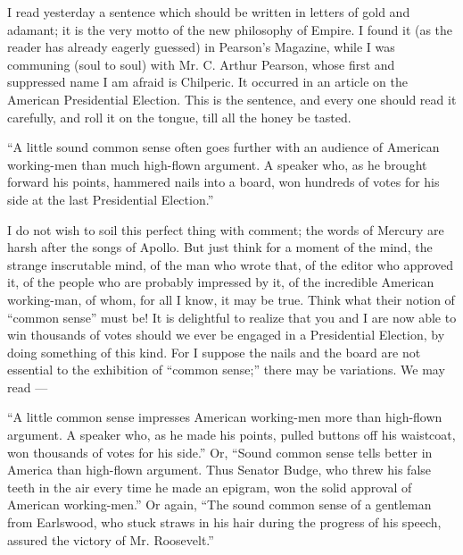 I read yesterday a sentence which should be written in letters of gold and adamant; it is the very motto of the new philosophy of Empire. I found it (as the reader has already eagerly guessed) in Pearson’s Magazine, while I was communing (soul to soul) with Mr. C. Arthur Pearson, whose first and suppressed name I am afraid is Chilperic. It occurred in an article on the American Presidential Election. This is the sentence, and every one should read it carefully, and roll it on the tongue, till all the honey be tasted.

“A little sound common sense often goes further with an audience of American working-men than much high-flown argument. A speaker who, as he brought forward his points, hammered nails into a board, won hundreds of votes for his side at the last Presidential Election.”

I do not wish to soil this perfect thing with comment; the words of Mercury are harsh after the songs of Apollo. But just think for a moment of the mind, the strange inscrutable mind, of the man who wrote that, of the editor who approved it, of the people who are probably impressed by it, of the incredible American working-man, of whom, for all I know, it may be true. Think what their notion of “common sense” must be! It is delightful to realize that you and I are now able to win thousands of votes should we ever be engaged in a Presidential Election, by doing something of this kind. For I suppose the nails and the board are not essential to the exhibition of “common sense;” there may be variations. We may read —

“A little common sense impresses American working-men more than high-flown argument. A speaker who, as he made his points, pulled buttons off his waistcoat, won thousands of votes for his side.” Or, “Sound common sense tells better in America than high-flown argument. Thus Senator Budge, who threw his false teeth in the air every time he made an epigram, won the solid approval of American working-men.” Or again, “The sound common sense of a gentleman from Earlswood, who stuck straws in his hair during the progress of his speech, assured the victory of Mr. Roosevelt.”

